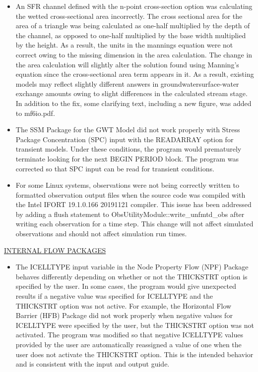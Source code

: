 \begin{itemize}
		\item An SFR channel defined with the n-point cross-section option was calculating the wetted cross-sectional area incorrectly. The cross sectional area for the area of a triangle was being calculated as one-half multiplied by the depth of the channel, as opposed to one-half multiplied by the base width multiplied by the height. As a result, the units in the mannings equation were not correct owing to the missing dimension in the area calculation.  The change in the area calculation will slightly alter the solution found using Manning's equation since the cross-sectional area term appears in it.  As a result, existing models may reflect slightly different answers in groundwater\/surface-water exchange amounts owing to slight differences in the calculated stream stage.  In addition to the fix, some clarifying text, including a new figure, was added to mf6io.pdf.
		\item The SSM Package for the GWT Model did not work properly with Stress Package Concentration (SPC) input with the READARRAY option for transient models.  Under these conditions, the program would prematurely terminate looking for the next BEGIN PERIOD block.  The program was corrected so that SPC input can be read for transient conditions.
		\item For some Linux systems, observations were not being correctly written to formatted observation output files when the source code was compiled with the Intel IFORT 19.1.0.166 20191121 compiler. This issue has been addressed by adding a flush statement to ObsUtilityModule::write\_unfmtd\_obs after writing each observation for a time step. This change will not affect simulated observations and should not affect simulation run times.
	\end{itemize}

	\underline{INTERNAL FLOW PACKAGES}
	\begin{itemize}
		\item The ICELLTYPE input variable in the Node Property Flow (NPF) Package behaves differently depending on whether or not the THICKSTRT option is specified by the user.  In some cases, the program would give unexpected results if a negative value was specified for ICELLTYPE and the THICKSTRT option was not active.  For example, the Horizontal Flow Barrier (HFB) Package did not work properly when negative values for ICELLTYPE were specified by the user, but the THICKSTRT option was not activated.  The program was modified so that negative ICELLTYPE values provided by the user are automatically reassigned a value of one when the user does not activate the THICKSTRT option.  This is the intended behavior and is consistent with the input and output guide.   
	\end{itemize}

